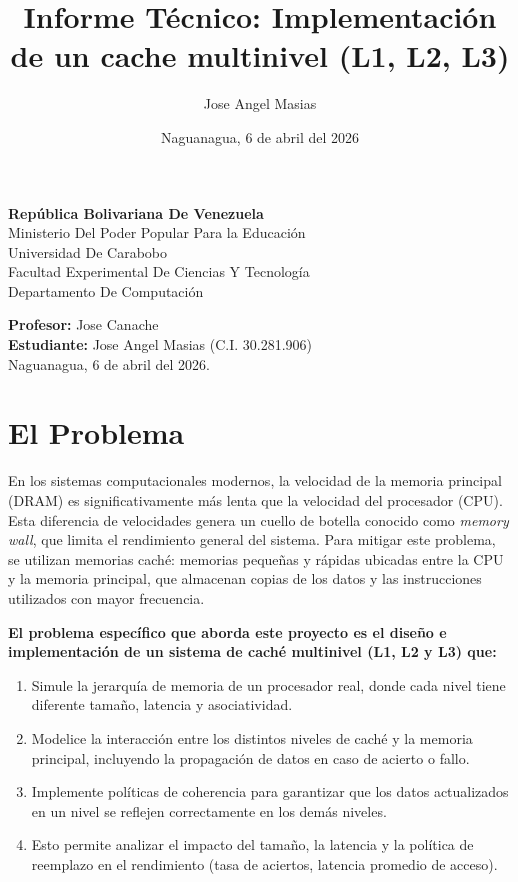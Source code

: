 \documentclass[12pt, letterpaper]{article}
\title{\textbf{Informe Técnico: Implementación de un cache multinivel (L1, L2, L3)}}
\author{Jose Angel Masias}
\date{Naguanagua, 6 de abril del 2026}
\begin{document}
\maketitle

\begin{center}
\textbf{República Bolivariana De Venezuela}\\
Ministerio Del Poder Popular Para la Educación\\
Universidad De Carabobo\\
Facultad Experimental De Ciencias Y Tecnología\\
Departamento De Computación
\end{center}

\vspace{0.5cm}

\noindent
\textbf{Profesor:} Jose Canache\\
\textbf{Estudiante:} Jose Angel Masias (C.I. 30.281.906)\\
Naguanagua, 6 de abril del 2026.

\newpage

\section{El Problema}

En los sistemas computacionales modernos, la velocidad de la memoria principal (DRAM) es significativamente más lenta que la velocidad del procesador (CPU). Esta diferencia de velocidades genera un cuello de botella conocido como \textit{memory wall}, que limita el rendimiento general del sistema. Para mitigar este problema, se utilizan memorias caché: memorias pequeñas y rápidas ubicadas entre la CPU y la memoria principal, que almacenan copias de los datos y las instrucciones utilizados con mayor frecuencia.

\textbf{El problema específico que aborda este proyecto es el diseño e implementación de un sistema de caché multinivel (L1, L2 y L3) que:}
\begin{enumerate}
    \item Simule la jerarquía de memoria de un procesador real, donde cada nivel tiene diferente tamaño, latencia y asociatividad.
    \item Modelice la interacción entre los distintos niveles de caché y la memoria principal, incluyendo la propagación de datos en caso de acierto o fallo.
    \item Implemente políticas de coherencia para garantizar que los datos actualizados en un nivel se reflejen correctamente en los demás niveles.
    \item Esto permite analizar el impacto del tamaño, la latencia y la política de reemplazo en el rendimiento (tasa de aciertos, latencia promedio de acceso).
\end{enumerate}
\end{document}
